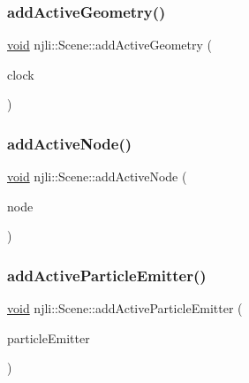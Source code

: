 \subsubsection{\texorpdfstring{add\+Active\+Geometry()}{addActiveGeometry()}}
{\footnotesize\ttfamily \mbox{\hyperlink{_thread_8h_af1e856da2e658414cb2456cb6f7ebc66}{void}} njli\+::\+Scene\+::add\+Active\+Geometry (\begin{DoxyParamCaption}\item[{\mbox{\hyperlink{classnjli_1_1_geometry}{Geometry}} $\ast$}]{clock }\end{DoxyParamCaption})\hspace{0.3cm}{\ttfamily [protected]}}

\mbox{\label{classnjli_1_1_scene_af1b996e40edb70d8eff9b3aef11f9197}} 
\subsubsection{\texorpdfstring{add\+Active\+Node()}{addActiveNode()}}
{\footnotesize\ttfamily \mbox{\hyperlink{_thread_8h_af1e856da2e658414cb2456cb6f7ebc66}{void}} njli\+::\+Scene\+::add\+Active\+Node (\begin{DoxyParamCaption}\item[{\mbox{\hyperlink{classnjli_1_1_node}{Node}} $\ast$}]{node }\end{DoxyParamCaption})\hspace{0.3cm}{\ttfamily [protected]}}

\mbox{\label{classnjli_1_1_scene_ac4345dcab380f4f28240047f684100a8}} 
\subsubsection{\texorpdfstring{add\+Active\+Particle\+Emitter()}{addActiveParticleEmitter()}}
{\footnotesize\ttfamily \mbox{\hyperlink{_thread_8h_af1e856da2e658414cb2456cb6f7ebc66}{void}} njli\+::\+Scene\+::add\+Active\+Particle\+Emitter (\begin{DoxyParamCaption}\item[{\mbox{\hyperlink{classnjli_1_1_particle_emitter}{Particle\+Emitter}} $\ast$}]{particle\+Emitter }\end{DoxyParamCaption})\hspace{0.3cm}{\ttfamily [protected]}}

